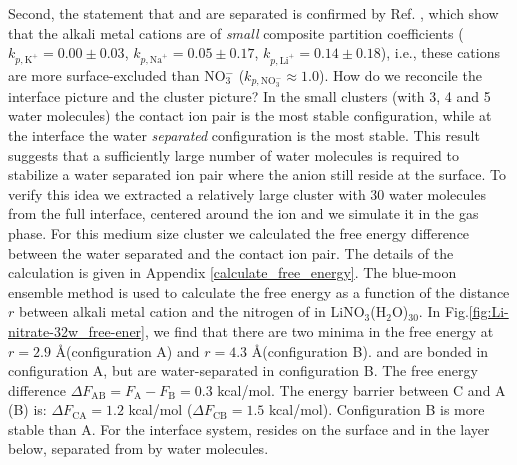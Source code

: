 Second, the statement that \Li and \nitrate are separated is confirmed by Ref. \cite{Pegram06,Pegram08},
which show that the alkali metal cations are of \emph{small}
composite partition coefficients ($k_{p,\text{K}^+} = 0.00\pm 0.03$, $k_{p,\text{Na}^+} = 0.05\pm 0.17$, $k_{p,\text{Li}^+} = 0.14\pm 0.18$), i.e., 
these cations are more surface-excluded than 
NO$_3^-$ ($k_{p,\text{NO}_3^-} \approx 1.0$).
How do we reconcile the interface picture and the cluster picture?
In the small clusters (with 3, 4 and 5 water molecules) the contact ion pair is the most stable configuration, 
while at the interface the water \emph{separated} configuration is the most stable.
This result suggests that a sufficiently large number of water molecules is required to stabilize a water separated ion pair where
the \nitrate anion still reside at the surface. 
To verify this idea we extracted a relatively large cluster with 30 water molecules from the full interface, centered
around the \Li ion and we simulate it in the gas phase. 
For this medium size cluster we calculated the free energy difference between the
water separated and the contact ion pair. The details of the calculation is given in Appendix \ref{calculate_free_energy}. 
The blue-moon ensemble method \cite{CCHK89,Sprik98,Tuckerman10} is used to calculate the free energy as a function of  
the distance $r$ between alkali metal cation and the nitrogen of \nitrate in LiNO$_3$(H$_2$O)$_{30}$.
In Fig.\thinspace\ref{fig:Li-nitrate-32w_free-ener}, we find that there are two minima in the free energy
at $r=2.9$ \AA (configuration A)  and $r=4.3$ \AA(configuration B).
\Li and \nitrate are bonded in configuration A, but are water-separated in configuration B.
The free energy difference $\Delta{F}_{\text{AB}}=F_{\text{A}}-F_{\text{B}} = 0.3$ kcal/mol. 
The energy barrier between C and A (B) is:
$\Delta{F_{\text{CA}}} = 1.2$ kcal/mol ($\Delta F_{\text{CB}} = 1.5$ kcal/mol). Configuration B is more stable than A.
For the interface system, \nitrate resides on the surface and \Li in the layer below, separated from \nitrate by water molecules.
